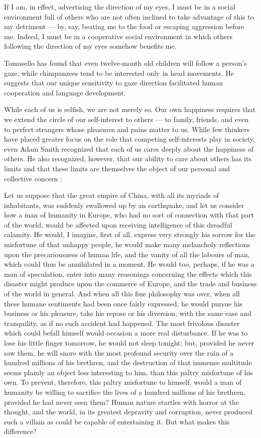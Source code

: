 \documentclass[a4paper,14pt]{extbook}
\begin{document}
If I am, in effect, advertising the direction of my eyes, I must be in a social environment full of others who are not often inclined to take advantage of this to my detriment --- by, say, beating me to the food or escaping aggression before me.
Indeed, I must be in a cooperative social environment in which others following the direction of my eyes somehow benefits me.

Tomasello has found that even twelve-month old children will follow a person's gaze, while chimpanzees tend to be interested only in head movements.
He suggests that our unique sensitivity to gaze direction facilitated human cooperation and language development.

While each of us is selfish, we are not merely so.
Our own happiness requires that we extend the circle of our self-interest to others --- to family, friends, and even to perfect strangers whose pleasures and pains matter to us.
While few thinkers have placed greater focus on the role that competing self-interests play in society, even Adam Smith recognized that each of us cares deeply about the happiness of others.
He also recognized, however, that our ability to care about others has its limits and that these limits are themselves the object of our personal and collective concern :

Let us suppose that the great empire of China, with all its myriads of inhabitants, was suddenly swallowed up by an earthquake, and let us consider how a man of humanity in Europe, who had no sort of connection with that part of the world, would be affected upon receiving intelligence of this dreadful calamity.
He would, I imagine, first of all, express very strongly his sorrow for the misfortune of that unhappy people, he would make many melancholy reflections upon the precariousness of human life, and the vanity of all the labours of man, which could thus be annihilated in a moment.
He would too, perhaps, if he was a man of speculation, enter into many reasonings concerning the effects which this disaster might produce upon the commerce of Europe, and the trade and business of the world in general.
And when all this fine philosophy was over, when all these humane sentiments had been once fairly expressed, he would pursue his business or his pleasure, take his repose or his diversion, with the same ease and tranquility, as if no such accident had happened.
The most frivolous disaster which could befall himself would occasion a more real disturbance.
If he was to lose his little finger tomorrow, he would not sleep tonight;
but, provided he never saw them, he will snore with the most profound security over the ruin of a hundred millions of his brethren, and the destruction of that immense multitude seems plainly an object less interesting to him, than this paltry misfortune of his own.
To prevent, therefore, this paltry misfortune to himself, would a man of humanity be willing to sacrifice the lives of a hundred millions of his brethren, provided he had never seen them?
Human nature startles with horror at the thought, and the world, in its greatest depravity and corruption, never produced such a villain as could be capable of entertaining it.
But what makes this difference?
\end{document}

